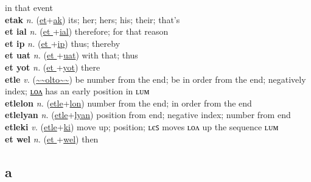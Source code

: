 in that event \label{et ayf} \\
\textbf{etak} \textit{n.} (\hyperref[et]{et}+\hyperref[ak]{ak})
its; her; hers; his; their; that's \label{etak} \\
\textbf{et ial} \textit{n.} (\hyperref[et ]{et }+\hyperref[al]{ial})
therefore; for that reason \label{et ial} \\
\textbf{et ip} \textit{n.} (\hyperref[et ]{et }+\hyperref[p]{ip})
thus; thereby \label{et ip} \\
\textbf{et uat} \textit{n.} (\hyperref[et ]{et }+\hyperref[at]{uat})
with that; thus \label{et uat} \\
\textbf{et yot} \textit{n.} (\hyperref[et ]{et }+\hyperref[ot]{yot})
there \label{et yot} \\
\textbf{etle} \textit{v.} (\hyperref[olto]{\~{}\~{}olto\~{}\~{}})
be number from the end; be in order from the end; negatively index; \hyperref[etlelon]{ʟᴏᴧ} has an early position in ʟᴜᴍ \label{etle} \\
\textbf{etlelon} \textit{n.} (\hyperref[etle]{etle}+\hyperref[lon]{lon})
number from the end; in order from the end \label{etlelon} \\
\textbf{etlelyan} \textit{n.} (\hyperref[etle]{etle}+\hyperref[lyan]{lyan})
position from end; negative index; number from end \label{etlelyan} \\
\textbf{etleki} \textit{v.} (\hyperref[etle]{etle}+\hyperref[ki]{ki})
move up; position; ʟєꜱ moves ʟᴏᴧ up the sequence ʟᴜᴍ \label{etleki} \\
\textbf{et wel} \textit{n.} (\hyperref[et ]{et }+\hyperref[el]{wel})
then \label{et wel} \\
\subsection{a}

